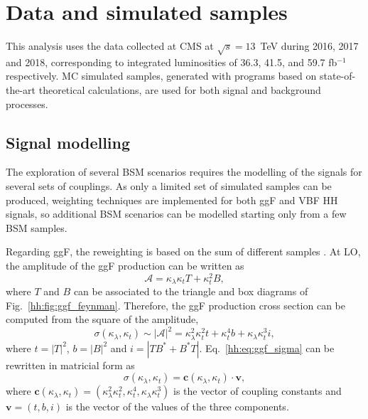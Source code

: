 \documentclass[../main.tex]{subfiles}
\begin{document}
\section{Data and simulated samples}

This analysis uses the data collected at CMS at $\sqrt{s}=13$~TeV during 2016, 2017 and 2018, corresponding to integrated luminosities of 36.3, 41.5, and 59.7 fb${}^{-1}$ respectively. MC simulated samples, generated with programs based on state-of-the-art theoretical calculations, are used for both signal and background processes.

\subsection{Signal modelling}
\label{hh:subsec:signal_modelling}


The exploration of several BSM scenarios requires the modelling of the signals for several sets of couplings. As only a limited set of simulated samples can be produced, weighting techniques are implemented for both ggF and VBF HH signals, so additional BSM scenarios can be modelled starting only from a few BSM samples. 

Regarding ggF, the reweighting is based on the sum of different samples \cite{hh:analysis:ggf_reweighting}. At LO, the amplitude of the ggF production can be written as
\begin{equation}
\mathcal{A} = \kappa_\lambda\kappa_t T + \kappa_t^2 B,
\end{equation}
where $T$ and $B$ can be associated to the triangle and box diagrams of Fig.~\ref{hh:fig:ggf_feynman}. Therefore, the ggF production cross section can be computed from the square of the amplitude,
\begin{equation}
\label{hh:eq:ggf_sigma}
\sigma(\kappa_\lambda, \kappa_t) \sim |\mathcal{A}|^2 = \kappa_\lambda^2\kappa_t^2 t + \kappa_t^4b + \kappa_\lambda\kappa_t^3 i,
\end{equation}
where $t = |T|^2$, $b=|B|^2$ and $i=|TB^* + B^*T|$. Eq.~\eqref{hh:eq:ggf_sigma} can be rewritten in matricial form as
\begin{equation}
\label{hh:eq:ggf_sigma_vector}
\sigma(\kappa_\lambda, \kappa_t) = \mathbf{c}(\kappa_\lambda, \kappa_t) \cdot \mathbf{v},
\end{equation}
where $\mathbf{c}(\kappa_\lambda, \kappa_t) = (\kappa_\lambda^2\kappa_t^2, \kappa_t^4, \kappa_\lambda\kappa_t^3)$ is the vector of coupling constants and $\mathbf{v} = (t, b, i)$ is the vector of the values of the three components.
\end{document}

